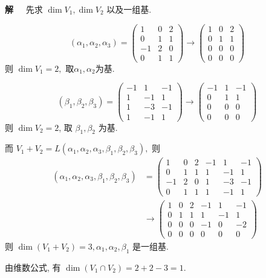 \documentclass[13pt]{beamer}
\def\sol{{\bf 解~~ }}
\begin{document}
\begin{frame}
\sol 
先求 $\operatorname{dim} V_{1}, \operatorname{dim} V_{2}$ 以及一组基.


\[
\left(\alpha_{1}, \alpha_{2}, \alpha_{3}\right)
=\left(\begin{array}{ccc}
1 & 0 & 2 \\
0 & 1 & 1 \\
-1 & 2 & 0 \\
0 & 1 & 1
\end{array}\right) 
\rightarrow
\left(\begin{array}{ccc}
1 & 0 & 2 \\
0 & 1 & 1 \\
0 & 0 & 0 \\
0 & 0 & 0
\end{array}\right)
\]
则  $\operatorname{dim} V_{1}=2,$
取$\alpha_{1}, \alpha_{2} $为基.

\[
\left(\beta_{1}, \beta_{2}, \beta_{3}\right)
=\left(\begin{array}{ccc}
-1 & 1 & -1 \\
1 & -1 & 1 \\
1 & -3 & -1 \\
1 & -1 & 1
\end{array}\right) 
\rightarrow
\left(\begin{array}{ccc}
-1 & 1 & -1 \\
0 & 1 & 1 \\
0 & 0 & 0 \\
0 & 0 & 0
\end{array}\right) 
\]
则  $\operatorname{dim} V_{2}=2$,
{ 取 } $\beta_{1}, \beta_{2}$  { 为基. }
\end{frame}

\begin{frame}
而 
$V_{1}+V_{2}=L\left(\alpha_{1}, \alpha_{2}, \alpha_{3}, \beta_{1}, \beta_{2}, \beta_{3}\right), $
则
\begin{align*}
\left(\alpha_{1}, \alpha_{2}, \alpha_{3}, \beta_{1}, \beta_{2}, \beta_{3}\right)
& =\left(\begin{array}{ccc|ccc}
1 & 0 & 2 & -1 & 1 & -1 \\
0 & 1 & 1 & 1 & -1 & 1 \\
-1 & 2 & 0 & 1 & -3 & -1 \\
0 & 1 & 1 & 1 & -1 & 1
\end{array}\right) \\
& \rightarrow
\left(\begin{array}{ccc|ccc}
1 & 0 & 2 & -1 & 1 & -1 \\
0 & 1 & 1 & 1 & -1 & 1 \\
0 & 0 & 0 & -1 & 0 & -2 \\
0 & 0 & 0 & 0 & 0 & 0
\end{array}\right) 
\end{align*}
{ 则 } $\operatorname{dim}\left(V_{1}+V_{2}\right)=3, \alpha_{1}, \alpha_{2}, \beta_{1}$ 是一组基.

由维数公式, 有 $\operatorname{dim}\left(V_{1} \cap V_{2}\right)=2+2-3=1$.
\end{frame}
\end{document}
